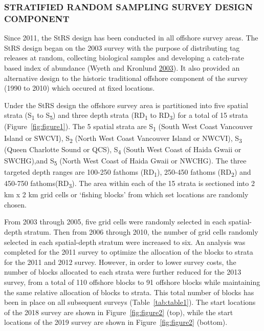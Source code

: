 \documentclass[12pt]{article}\usepackage[]{graphicx}\usepackage[]{color}
\begin{document}
\hypertarget{stratified-random-sampling-survey-design-component}{%
\subsubsection{STRATIFIED RANDOM SAMPLING SURVEY DESIGN COMPONENT}\label{stratified-random-sampling-survey-design-component}}

Since 2011, the StRS design has been conducted in all offshore survey areas. The StRS design began on the 2003 survey with the purpose of distributing tag releases at random, collecting biological samples and developing a catch-rate based index of abundance (Wyeth and Kronlund \protect\hyperlink{ref-Wyeth2003}{2003}). It also provided an alternative design to the historic traditional offshore component of the survey (1990 to 2010) which occured at fixed locations.

Under the StRS design the offshore survey area is partitioned into five spatial strata (S\textsubscript{1} to S\textsubscript{5}) and three depth strata (RD\textsubscript{1} to RD\textsubscript{3}) for a total of 15 strata (Figure~\ref{fig:figure1}). The 5 spatial strata are S\textsubscript{1} (South West Coast Vancouver Island or SWCVI), S\textsubscript{2} (North West Coast Vancouver Island or NWCVI), S\textsubscript{3} (Queen Charlotte Sound or QCS), S\textsubscript{4} (South West Coast of Haida Gwaii or SWCHG),and S\textsubscript{5} (North West Coast of Haida Gwaii or NWCHG). The three targeted depth ranges are 100-250 fathoms (RD\textsubscript{1}), 250-450 fathoms (RD\textsubscript{2}) and 450-750 fathoms(RD\textsubscript{3}). The area within each of the 15 strata is sectioned into 2 km x 2 km grid cells or `fishing blocks' from which set locations are randomly chosen.

From 2003 through 2005, five grid cells were randomly selected in each spatial-depth stratum. Then from 2006 through 2010, the number of grid cells randomly selected in each spatial-depth stratum were increased to six. An analysis was completed for the 2011 survey to optimize the allocation of the blocks to strata for the 2011 and 2012 survey. However, in order to lower survey costs, the number of blocks allocated to each strata were further reduced for the 2013 survey, from a total of 110 offshore blocks to 91 offshore blocks while maintaining the same relative allocation of blocks to strata. This total number of blocks has been in place on all subsequent surveys (Table~\ref{tab:table1}). The start locations of the 2018 survey are shown in Figure~\ref{fig:figure2} (top), while the start locations of the 2019 survey are shown in Figure~\ref{fig:figure2} (bottom).
\end{document}
